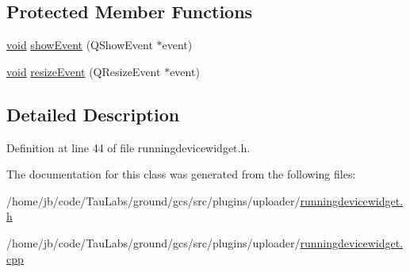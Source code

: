 \subsection*{\-Protected \-Member \-Functions}
\begin{DoxyCompactItemize}
\item 
\hyperlink{group___u_a_v_objects_plugin_ga444cf2ff3f0ecbe028adce838d373f5c}{void} \hyperlink{group___y_modem_uploader_ga11be8942ae8b277f63d85dcb7c1449a4}{show\-Event} (\-Q\-Show\-Event $\ast$event)
\item 
\hyperlink{group___u_a_v_objects_plugin_ga444cf2ff3f0ecbe028adce838d373f5c}{void} \hyperlink{group___y_modem_uploader_ga66507a40f24abba397ae6ea6407a8d2c}{resize\-Event} (\-Q\-Resize\-Event $\ast$event)
\end{DoxyCompactItemize}


\subsection{\-Detailed \-Description}


\-Definition at line 44 of file runningdevicewidget.\-h.



\-The documentation for this class was generated from the following files\-:\begin{DoxyCompactItemize}
\item 
/home/jb/code/\-Tau\-Labs/ground/gcs/src/plugins/uploader/\hyperlink{runningdevicewidget_8h}{runningdevicewidget.\-h}\item 
/home/jb/code/\-Tau\-Labs/ground/gcs/src/plugins/uploader/\hyperlink{runningdevicewidget_8cpp}{runningdevicewidget.\-cpp}\end{DoxyCompactItemize}
